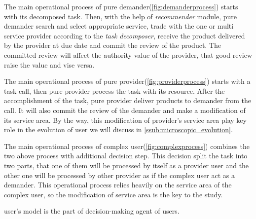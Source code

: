 
The main operational process of pure demander(\autoref{fig:demanderprocess}) starts with its decomposed task. Then, with the help of \textit{recommender} module, pure demander search and select appropriate service, trade with the one or multi service provider according to the \textit{task decomposer}, receive the product delivered by the provider at due date and commit the review of the product. The committed review will affect the authority value of the provider, that good review raise the value and vise versa.

The main operational process of pure provider(\autoref{fig:providerprocess}) starts with a task call, then pure provider process the task with its resource. After the accomplishment of the task, pure provider deliver products to demander from the call. It will also commit the review of the demander and make a modification of its service area. By the way, this modification of provider's service area play key role in the evolution of user we will discuss in \autoref{ssub:microscopic_evolution}.  

The main operational process of complex user(\autoref{fig:complexprocess}) combines the two above process with additional decision step. This decision split the task into two parts, that one of them will be processed by itself as a provider user and the other one will be processed by other provider as if the complex user act as a demander. This operational process relies heavily on the service area of the complex user, so the modification of service area is the key to the study.

user's model is the part of decision-making agent of users.



